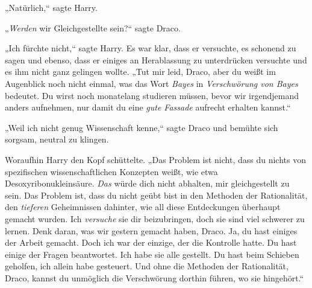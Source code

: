 „Natürlich,“ sagte Harry.

„\emph{Werden} wir Gleichgestellte sein?“ sagte Draco.

„Ich fürchte nicht,“ sagte Harry. Es war klar, dass er versuchte, es schonend zu sagen und ebenso, dass er einiges an Herablassung zu unterdrücken versuchte und es ihm nicht ganz gelingen wollte. „Tut mir leid, Draco, aber du weißt im Augenblick noch nicht einmal, was das Wort \emph{Bayes} in \emph{Verschwörung von Bayes} bedeutet. Du wirst noch monatelang studieren müssen, bevor wir irgendjemand anders aufnehmen, nur damit du eine \emph{gute Fassade} aufrecht erhalten kannst.“

„Weil ich nicht genug Wissenschaft kenne,“ sagte Draco und bemühte sich sorgsam, neutral zu klingen.

Woraufhin Harry den Kopf schüttelte. „Das Problem ist nicht, dass du nichts von spezifischen wissenschaftlichen Konzepten weißt, wie etwa Desoxyribonukleinsäure. \emph{Das} würde dich nicht abhalten, mir gleichgestellt zu sein. Das Problem ist, dass du nicht geübt bist in den Methoden der Rationalität, den \emph{tieferen} Geheimnissen dahinter, wie all diese Entdeckungen überhaupt gemacht wurden. Ich \emph{versuche} sie dir beizubringen, doch sie sind viel schwerer zu lernen. Denk daran, was wir gestern gemacht haben, Draco. Ja, du hast einiges der Arbeit gemacht. Doch ich war der einzige, der die Kontrolle hatte. Du hast einige der Fragen beantwortet. Ich habe sie alle gestellt. Du hast beim Schieben geholfen, ich allein habe gesteuert. Und ohne die Methoden der Rationalität, Draco, kannst du unmöglich die Verschwörung dorthin führen, wo sie hingehört.“


